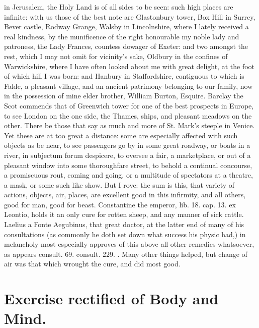 {in Jerusalem, the Holy Land is of all sides to be seen: such high
places are infinite: with us those of the best note are Glastonbury
tower, Box Hill in Surrey, Bever castle, Rodway Grange, Walsby in
Lincolnshire, where I lately received a real kindness, by the
munificence of the right honourable my noble lady and patroness, the
Lady Frances, countess dowager of Exeter: and two amongst the rest,
which I may not omit for vicinity's sake, Oldbury in the confines of
Warwickshire, where I have often looked about me with great delight, at
the foot of which hill I was born: and Hanbury in Staffordshire,
contiguous to which is Falde, a pleasant village, and an ancient
patrimony belonging to our family, now in the possession of mine elder
brother, William Burton, Esquire. Barclay the Scot commends that
of Greenwich tower for one of the best prospects in Europe, to see
London on the one side, the Thames, ships, and pleasant meadows on the
other. There be those that say as much and more of St. Mark's steeple
in Venice. Yet these are at too great a distance: some are especially
affected with such objects as be near, to see passengers go by in some
great roadway, or boats in a river, in subjectum forum despicere, to
oversee a fair, a marketplace, or out of a pleasant window into some
thoroughfare street, to behold a continual concourse, a promiscuous
rout, coming and going, or a multitude of spectators at a theatre, a
mask, or some such like show. But I rove: the sum is this, that variety
of actions, objects, air, places, are excellent good in this infirmity,
and all others, good for man, good for beast. Constantine the
emperor, lib. 18. cap. 13. ex Leontio, holds it an only cure for rotten
sheep, and any manner of sick cattle. Laelius a Fonte Aegubinus, that
great doctor, at the latter end of many of his consultations (as
commonly he doth set down what success his physic had,) in melancholy
most especially approves of this above all other remedies whatsoever,
as appears consult. 69. consult. 229. \etc{}. Many other things
helped, but change of air was that which wrought the cure, and did most
good.


\section{Exercise rectified of Body and Mind.}

}
